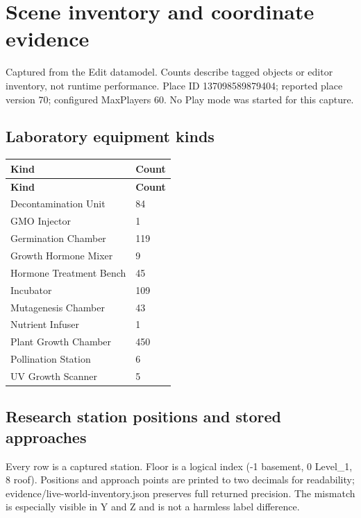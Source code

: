 \chapter{Scene inventory and coordinate evidence}
Captured from the Edit datamodel.\allowbreak{} Counts describe tagged objects or editor inventory, not runtime performance.\allowbreak{} Place ID 137098589879404; reported place version 70; configured MaxPlayers 60.\allowbreak{} No Play mode was started for this capture.\allowbreak{}

\section{Laboratory equipment kinds}
\begin{longtable}{p{}p{}}
\toprule
\textbf{Kind} & \textbf{Count} \\ \midrule
\endfirsthead
\textbf{Kind} & \textbf{Count} \\ \midrule
\endhead
Decontamination Unit & 84 \\
GMO Injector & 1 \\
Germination Chamber & 119 \\
Growth Hormone Mixer & 9 \\
Hormone Treatment Bench & 45 \\
Incubator & 109 \\
Mutagenesis Chamber & 43 \\
Nutrient Infuser & 1 \\
Plant Growth Chamber & 450 \\
Pollination Station & 6 \\
UV Growth Scanner & 5 \\
\bottomrule
\end{longtable}
\section{Research station positions and stored approaches}
Every row is a captured station.\allowbreak{} Floor is a logical index (-1 basement, 0 Level\_\allowbreak{}1, 8 roof).\allowbreak{} Positions and approach points are printed to two decimals for readability; evidence/\allowbreak{}live-world-inventory.\allowbreak{}json preserves full returned precision.\allowbreak{} The mismatch is especially visible in Y and Z and is not a harmless label difference.\allowbreak{}

